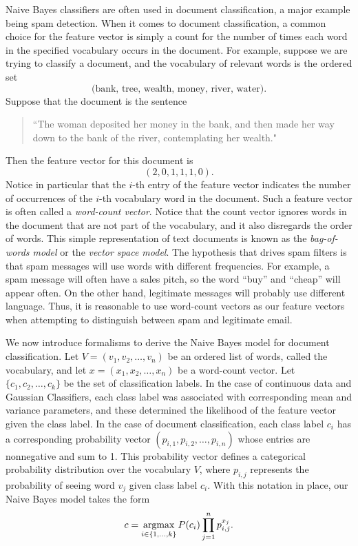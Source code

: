 Naive Bayes classifiers are often used in document classification, a major example being spam detection.
When it comes to document classification, a common choice for the feature vector
is simply a count for the number of times each word in the specified vocabulary occurs in the document.
For example, suppose we are trying to classify a document, and the vocabulary of relevant words is the ordered set
\[
\text{(bank, tree, wealth, money, river, water)}.
\]
Suppose that the document is the sentence
\begin{quotation}
``The woman deposited her money in the bank, and then made her way down to the bank of the river, contemplating her wealth."
\end{quotation}
Then the feature vector for this document is
\[
(2, 0, 1, 1, 1, 0).
\]
Notice in particular that the $i$-th entry of the feature vector indicates the number of occurrences of the $i$-th
vocabulary word in the document.
Such a feature vector is often called a \emph{word-count vector}.
Notice that the count vector ignores words in the document that are not part of the vocabulary, and
it also disregards the order of words.
This simple representation of text documents is known as the \emph{bag-of-words model} or the \emph{vector space model}.
The hypothesis that drives spam filters is that spam messages will use words with different frequencies.
For example, a spam message will often have a sales pitch, so the word ``buy'' and ``cheap'' will appear often.
On the other hand, legitimate messages will probably use different language.
Thus, it is reasonable to use word-count vectors as our feature vectors when attempting to distinguish between spam and
legitimate email.

We now introduce formalisms to derive the Naive Bayes model for document classification.
Let $V = (v_1,v_2,\ldots,v_n)$ be an ordered list of words, called the vocabulary, and let
$x = (x_1,x_2,\ldots,x_n)$ be a word-count vector.
Let $\{c_1,c_2,\ldots,c_k\}$ be the set of classification labels.
In the case of continuous data and Gaussian Classifiers, each class label was associated with corresponding
mean and variance parameters, and these determined the likelihood of the feature vector given the class label.
In the case of document classification, each class label $c_i$ has a corresponding probability vector
$(p_{i,1}, p_{i,2}, \ldots, p_{i,n})$ whose entries are nonnegative and sum to 1.
This probability vector defines a categorical probability distribution over the vocabulary $V$, where $p_{i,j}$
represents the probability of seeing word $v_j$ given class label $c_i$.
With this notation in place, our Naive Bayes model takes the form
\[
c = \underset{i \in \{1, \ldots, k\}}{\mbox{argmax}}\, P(c_i)\prod_{j=1}^n p_{i,j}^{x_j}.
\]

